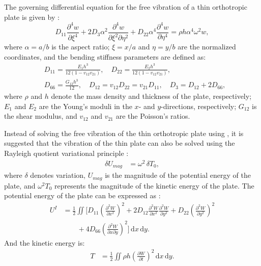 \documentclass[preprint,12pt]{elsarticle}
\begin{document}
The governing differential equation for the free vibration of a thin orthotropic plate is given by \citep{xing2020improved}:  
%
\begin{equation}\label{eq:governing_EOM}
	D_{11}\frac{\partial^4w}{\partial \xi^4} + 2D_3\alpha^2\frac{\partial^4w}{\partial \xi^2 \partial \eta^2} + D_{22}\alpha^4\frac{\partial^4w}{\partial \eta^4} = \rho h\alpha^4\omega^2w,
\end{equation}
%
where \( \alpha = a / b \) is the aspect ratio; \( \xi = x / a \) and \( \eta = y / b \) are the normalized coordinates,
and the bending stiffness parameters are defined as:
%
\begin{equation}\label{eq:bd_stiff}
	\begin{split}
		&D_{11} = \frac{E_1h^3}{12(1-v_{12}v_{21})}, \quad D_{22} = \frac{E_2h^3}{12(1-v_{12}v_{21})}, \\  
		&D_{66} = \frac{G_{12}h^3}{12}, \quad D_{12} = v_{12}D_{22} = v_{21}D_{11}, \quad D_3 = D_{12} + 2D_{66},
	\end{split}
\end{equation}
%
where \(\rho\) and \(h\) denote the mass density and thickness of the plate, respectively; \(E_1\) and \(E_2\) are the Young’s moduli in the \(x\)- and \(y\)-directions, respectively; \(G_{12}\) is the shear modulus, and \(v_{12}\) and \(v_{21}\) are the Poisson’s ratios.

Instead of solving the free vibration of the thin orthotropic plate using , it is suggested that the vibration of the thin plate can also be solved using the Rayleigh quotient variational principle \cite{xing2018overall}:
%
\begin{equation}\label{eq:Rayleigh}
	\begin{split}
		\delta U_{mag} &= \omega^2\,\delta T_0,
	\end{split}
\end{equation}
%
where \(\delta\) denotes variation, \(U_{mag}\) is the magnitude of the potential energy of the plate, and \(\omega^2 T_0\) represents the magnitude of the kinetic energy of the plate.
The potential energy of the plate can be expressed as \cite{xing2020extended}:
%
\begin{equation}\label{eq:poten_energy}
	\begin{split}
		U^{I} &= \frac{1}{2}\iint \Big[D_{11}\left(\frac{\partial^2 W}{\partial x^2}\right)^2 + 2D_{12}\frac{\partial^2 W}{\partial x^2}\frac{\partial^2 W}{\partial y^2} + D_{22}\left(\frac{\partial^2 W}{\partial y^2}\right)^2 \\
		&\qquad + 4D_{66}\left(\frac{\partial^2 W}{\partial x \partial y}\right)^2\Big] \, \mathrm{d}x \, \mathrm{d}y.
	\end{split}
\end{equation}
%
And the kinetic energy is:
%
\begin{equation}\label{eq:kine_energy}
	\begin{split}
		T &= \frac{1}{2}\iint \rho h \left(\frac{\partial W}{\partial t}\right)^2 \, \mathrm{d}x \, \mathrm{d}y.
	\end{split}
\end{equation}
\end{document}
